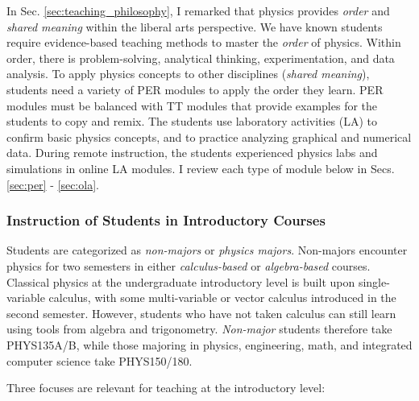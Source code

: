 \documentclass[../../../main.tex]{subfiles}
\begin{document}
In Sec. \ref{sec:teaching_philosophy}, I remarked that physics provides \textit{order} and \textit{shared meaning} within the liberal arts perspective.  We have known students require evidence-based teaching methods to master the \textit{order} of physics.  Within order, there is problem-solving, analytical thinking, experimentation, and data analysis.  To apply physics concepts to other disciplines (\textit{shared meaning}), students need a variety of PER modules to apply the order they learn.  PER modules must be balanced with TT modules that provide examples for the students to copy and remix.  The students use laboratory activities (LA) to confirm basic physics concepts, and to practice analyzing graphical and numerical data.  During remote instruction, the students experienced physics labs and simulations in online LA modules.  I review each type of module below in Secs. \ref{sec:per} - \ref{sec:ola}.

\subsubsection{Instruction of Students in Introductory Courses}

Students are categorized as \textit{non-majors} or \textit{physics majors}.  Non-majors encounter physics for two semesters in either \textit{calculus-based} or \textit{algebra-based} courses.  Classical physics at the undergraduate introductory level is built upon single-variable calculus, with some multi-variable or vector calculus introduced in the second semester.  However, students who have not taken calculus can still learn using tools from algebra and trigonometry.  \textit{Non-major} students therefore take PHYS135A/B, while those majoring in physics, engineering, math, and integrated computer science take PHYS150/180.
\\
\vspace{0.25cm}

Three focuses are relevant for teaching at the introductory level:
\end{document}
